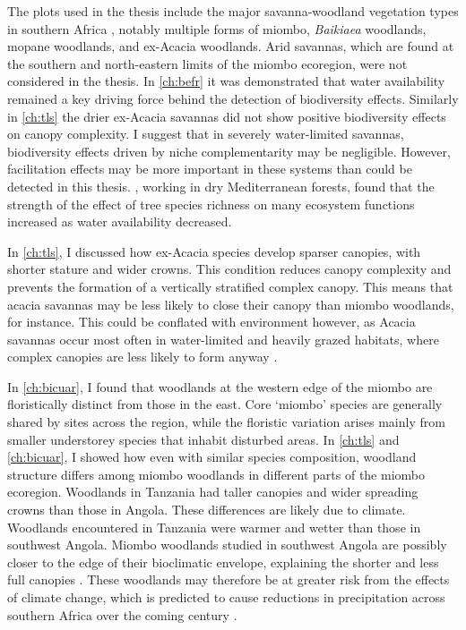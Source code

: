 \begin{refsection}
The plots used in the thesis include the major savanna-woodland vegetation types in southern Africa \citep{White1983}, notably multiple forms of miombo, \textit{Baikiaea} woodlands, mopane woodlands, and ex-Acacia woodlands. Arid savannas, which are found at the southern and north-eastern limits of the miombo ecoregion, were not considered in the thesis. In \autoref{ch:befr} it was demonstrated that water availability remained a key driving force behind the detection of biodiversity effects. Similarly in \autoref{ch:tls} the drier ex-Acacia savannas did not show positive biodiversity effects on canopy complexity. I suggest that in severely water-limited savannas, biodiversity effects driven by niche complementarity may be negligible. However, facilitation effects may be more important in these systems than could be detected in this thesis. \citet{Ratcliffe2017}, working in dry Mediterranean forests, found that the strength of the effect of tree species richness on many ecosystem functions increased as water availability decreased. 

In \autoref{ch:tls}, I discussed how ex-Acacia species develop sparser canopies, with shorter stature and wider crowns. This condition reduces canopy complexity and prevents the formation of a vertically stratified complex canopy. This means that acacia savannas may be less likely to close their canopy than miombo woodlands, for instance. This could be conflated with environment however, as Acacia savannas occur most often in water-limited and heavily grazed habitats, where complex canopies are less likely to form anyway \citep{Archibald2003}.

In \autoref{ch:bicuar}, I found that woodlands at the western edge of the miombo are floristically distinct from those in the east. Core `miombo' species are generally shared by sites across the region, while the floristic variation arises mainly from smaller understorey species that inhabit disturbed areas. In \autoref{ch:tls} and \autoref{ch:bicuar}, I showed how even with similar species composition, woodland structure differs among miombo woodlands in different parts of the miombo ecoregion. Woodlands in Tanzania had taller canopies and wider spreading crowns than those in Angola. These differences are likely due to climate. Woodlands encountered in Tanzania were warmer and wetter than those in southwest Angola. Miombo woodlands studied in southwest Angola are possibly closer to the edge of their bioclimatic envelope, explaining the shorter and less full canopies \citep{Scholes2002}. These woodlands may therefore be at greater risk from the effects of climate change, which is predicted to cause reductions in precipitation across southern Africa over the coming century \citep{Kusangaya2014}.


\end{refsection}
